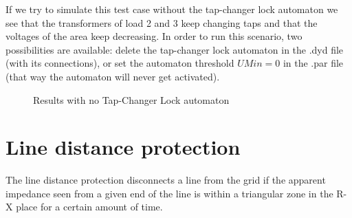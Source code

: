 \documentclass[a4paper, 12pt]{report}
\begin{document}
If we try to simulate this test case without the tap-changer lock automaton we see that the transformers of load 2 and 3 keep changing taps and that the voltages of the area keep decreasing. In order to run this scenario, two possibilities are available: delete the tap-changer lock automaton in the .dyd file (with its connections), or set the automaton threshold $UMin=0$ in the .par file (that way the automaton will never get activated).

\begin{figure}[H]
\caption{Results with no Tap-Changer Lock automaton}
\end{figure}

\newpage
\section{Line distance protection}
\label{DistanceProtection}

The line distance protection disconnects a line from the grid if the apparent impedance seen from a given end of the line is within a triangular zone in the R-X place for a certain amount of time.
\end{document}
